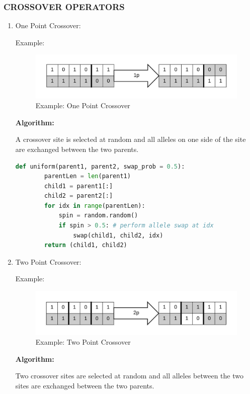 \documentclass[12pt,a4paper]{article}
\begin{document}
	\subsubsection{CROSSOVER OPERATORS} \label{sec:crossover}
	\begin{enumerate}

	\item One Point Crossover: \par
	
	Example:
	\begin{figure}[h]
		\includegraphics[width=\textwidth]{xover-1p}
		\caption{Example: One Point Crossover}
		\centering
	\end{figure}
	
	\textbf{Algorithm:} \par
	A crossover site is selected at random and all alleles on one side of the site are exchanged between the two parents.
	\begin{lstlisting}[language=Python]
    def uniform(parent1, parent2, swap_prob = 0.5):
        parentLen = len(parent1)
        child1 = parent1[:]
        child2 = parent2[:]
        for idx in range(parentLen):
            spin = random.random()
            if spin > 0.5: # perform allele swap at idx
                swap(child1, child2, idx)
        return (child1, child2)
	\end{lstlisting}

	\item Two Point Crossover: \par
	Example:
	\begin{figure}[h]
		\includegraphics[width=\textwidth]{xover-2p}
		\caption{Example: Two Point Crossover}
		\centering
	\end{figure}
	
	\textbf{Algorithm:} \par
	Two crossover sites are selected at random and all alleles between the two sites are exchanged between the two parents.	
	

\end{enumerate}
\end{document}
